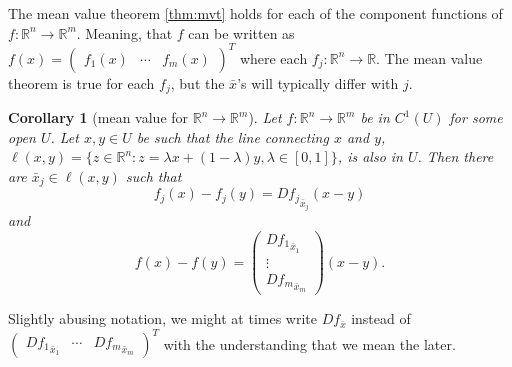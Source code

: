 \documentclass[12pt,reqno]{amsart}
\newtheorem{corollary}{Corollary}[section]
\theoremstyle{definition}
\def\R{\mathbb{R}}
\renewcommand{\to}{{\rightarrow}}
\begin{document}
The mean value theorem \ref{thm:mvt} holds for each of the component
functions of $f:\R^n \to \R^m$. Meaning, that $f$ can be written as
$f(x) = \begin{pmatrix} f_1(x) & \cdots & f_m(x) \end{pmatrix}^T$
where each $f_j:\R^n \to \R$. The mean value theorem is true for each
$f_j$, but the $\bar{x}$'s will typically differ with $j$.
\begin{corollary}[mean value for $\R^n \to \R^m$]\label{thm:mvtm}
  Let $f:\R^n \to \R^m$ be in $C^1(U)$ for some open $U$. Let
  $x, y
  \in U$ be such that the line connecting $x$ and
  $y$, $\ell(x,y) =
  \{z\in \R^n: z = \lambda x + (1-\lambda) y, \lambda \in [0,1]\}$, is
  also in $U$. Then there are $\bar{x}_j \in \ell(x,y)$ such that
  \[ f_j(x) - f_j(y) = D{f_j}_{\bar{x}_j} (x-y) \]
  and
  \[ f(x) - f(y) = \begin{pmatrix} D{f_1}_{\bar{x}_1} \\
    \vdots \\
    D{f_m}_{\bar{x}_m} \end{pmatrix} (x-y). 
  \]  
\end{corollary}
Slightly abusing notation, we might at times write $Df_{\bar{x}}$
instead of $\begin{pmatrix} D{f_1}_{\bar{x}_1} & \cdots &
  D{f_m}_{\bar{x}_m} \end{pmatrix}^T$ with the understanding that we
mean the later.  
\end{document}
